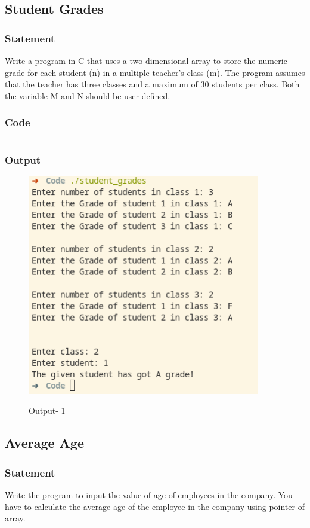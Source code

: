 \subsection{Student Grades}

\subsubsection{Statement}
Write a program in C that uses a two-dimensional array to store the numeric grade for
each student (n) in a multiple teacher’s class (m). The program assumes that the teacher has three
classes and a maximum of 30 students per class. Both the variable M and N should be user
defined.

\subsubsection{Code}
\inputminted[]{c}{../Code/student_grades.cpp}
\subsubsection{Output}
\begin{figure}[!htb]
  \centering
  \includegraphics[width=4in]{Images/1.png}
  \label{Output-1}
  \caption{Output- 1}
\end{figure}

\pagebreak
\subsection{Average Age}

\subsubsection{Statement}
Write the program to input the value of age of employees in the company. You have to
calculate the average age of the employee in the company using pointer of array.

